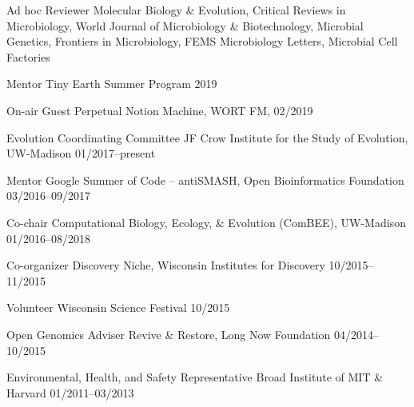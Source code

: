 

\begin{cvhonors}

\cvhonor
{Ad hoc Reviewer}
{Molecular Biology \& Evolution, Critical Reviews in Microbiology, World Journal of Microbiology \& Biotechnology, Microbial Genetics, Frontiers in Microbiology, FEMS Microbiology Letters, Microbial Cell Factories}
{}

\cvhonor
{Mentor}
{Tiny Earth Summer Program}
{2019}

\cvhonor
{On-air Guest}
{Perpetual Notion Machine, WORT FM, \textbf{\textit{}}}
{02/2019}

\cvhonor
{Evolution Coordinating Committee}
{JF Crow Institute for the Study of Evolution, UW-Madison}
{01/2017--present}

\cvhonor
{Mentor}
{Google Summer of Code -- antiSMASH, Open Bioinformatics Foundation}
{03/2016--09/2017}

\cvhonor
{Co-chair}
{Computational Biology, Ecology, \& Evolution (ComBEE), UW-Madison}
{01/2016--08/2018}

\cvhonor
{Co-organizer}
{Discovery Niche, Wisconsin Institutes for Discovery}
{10/2015--11/2015}

\cvhonor
{Volunteer}
{Wisconsin Science Festival}
{10/2015}

\cvhonor
{Open Genomics Adviser}
{Revive \& Restore, Long Now Foundation}
{04/2014--10/2015}

\cvhonor
{Environmental, Health, and Safety Representative}
{Broad Institute of MIT \& Harvard}
{01/2011--03/2013}

\end{cvhonors}